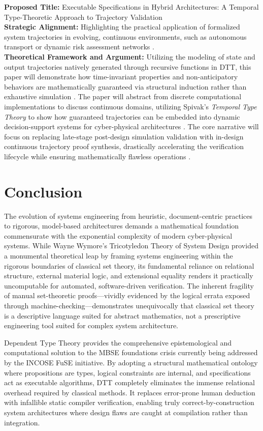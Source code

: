\documentclass[11pt]{article}
\begin{document}
\noindent \textbf{Proposed Title:} Executable Specifications in Hybrid Architectures: A Temporal Type-Theoretic Approach to Trajectory Validation\\
\textbf{Strategic Alignment:} Highlighting the practical application of formalized system trajectories in evolving, continuous environments, such as autonomous transport or dynamic risk assessment networks \parencite{Ref64}.\\
\textbf{Theoretical Framework and Argument:} Utilizing the modeling of state and output trajectories natively generated through recursive functions in DTT, this paper will demonstrate how time-invariant properties and non-anticipatory behaviors are mathematically guaranteed via structural induction rather than exhaustive simulation \parencite{Ref27}. The paper will abstract from discrete computational implementations to discuss continuous domains, utilizing Spivak's \textit{Temporal Type Theory} to show how guaranteed trajectories can be embedded into dynamic decision-support systems for cyber-physical architectures \parencite{Ref50, Ref55, Ref64}. The core narrative will focus on replacing late-stage post-design simulation validation with in-design continuous trajectory proof synthesis, drastically accelerating the verification lifecycle while ensuring mathematically flawless operations \parencite{Ref40, Ref56, Ref69}.\section{Conclusion}

The evolution of systems engineering from heuristic, document-centric practices to rigorous, model-based architectures demands a mathematical foundation commensurate with the exponential complexity of modern cyber-physical systems. While Wayne Wymore's Tricotyledon Theory of System Design provided a monumental theoretical leap by framing systems engineering within the rigorous boundaries of classical set theory, its fundamental reliance on relational structure, external material logic, and extensional equality renders it practically uncomputable for automated, software-driven verification. The inherent fragility of manual set-theoretic proofs---vividly evidenced by the logical errata exposed through machine-checking---demonstrates unequivocally that classical set theory is a descriptive language suited for abstract mathematics, not a prescriptive engineering tool suited for complex system architecture.

Dependent Type Theory provides the comprehensive epistemological and computational solution to the MBSE foundations crisis currently being addressed by the INCOSE FuSE initiative. By adopting a structural mathematical ontology where propositions are types, logical constraints are internal, and specifications act as executable algorithms, DTT completely eliminates the immense relational overhead required by classical methods. It replaces error-prone human deduction with infallible static compiler verification, enabling truly correct-by-construction system architectures where design flaws are caught at compilation rather than integration. 
\end{document}
